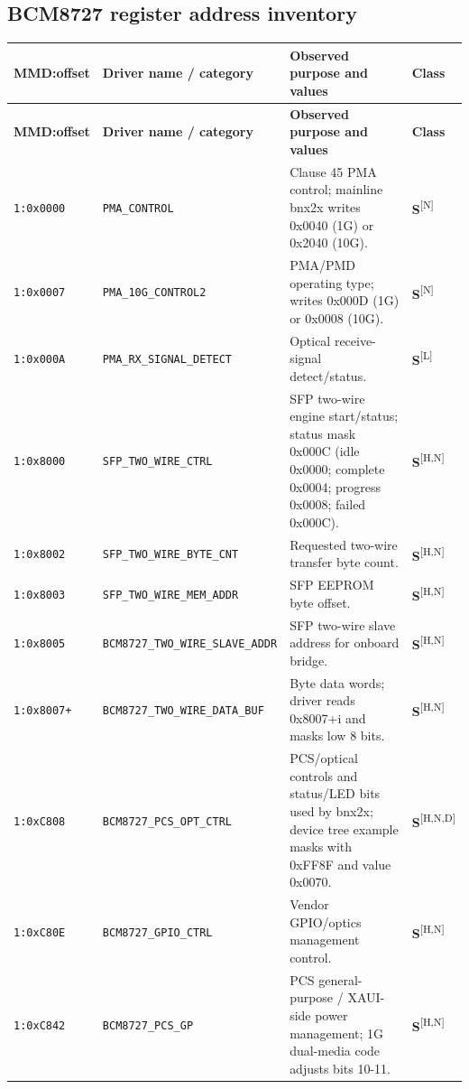 \documentclass[10pt,a4paper]{article}
\newcommand{\m}[1]{\textsf{\color{blue}\bfseries #1}}
\newcommand{\src}[1]{\textsuperscript{[#1]}}
\begin{document}
\subsection{BCM8727 register address inventory}
\scriptsize
\setlength\LTleft{0pt}
\setlength\LTright{0pt}
\begin{longtable}{@{}p{19mm}p{42mm}p{85mm}p{10mm}@{}}
\toprule
\textbf{MMD:offset} & \textbf{Driver name / category} & \textbf{Observed purpose and values} & \textbf{Class}\\\midrule
\endfirsthead
\toprule
\textbf{MMD:offset} & \textbf{Driver name / category} & \textbf{Observed purpose and values} & \textbf{Class}\\\midrule
\endhead
\texttt{1:0x0000} & \texttt{PMA\_CONTROL} & Clause 45 PMA control; mainline bnx2x writes 0x0040 (1G) or 0x2040 (10G). & \m{S}\src{N} \\
\texttt{1:0x0007} & \texttt{PMA\_10G\_CONTROL2} & PMA/PMD operating type; writes 0x000D (1G) or 0x0008 (10G). & \m{S}\src{N} \\
\texttt{1:0x000A} & \texttt{PMA\_RX\_SIGNAL\_DETECT} & Optical receive-signal detect/status. & \m{S}\src{L} \\
\texttt{1:0x8000} & \texttt{SFP\_TWO\_WIRE\_CTRL} & SFP two-wire engine start/status; status mask 0x000C (idle 0x0000; complete 0x0004; progress 0x0008; failed 0x000C). & \m{S}\src{H,N} \\
\texttt{1:0x8002} & \texttt{SFP\_TWO\_WIRE\_BYTE\_CNT} & Requested two-wire transfer byte count. & \m{S}\src{H,N} \\
\texttt{1:0x8003} & \texttt{SFP\_TWO\_WIRE\_MEM\_ADDR} & SFP EEPROM byte offset. & \m{S}\src{H,N} \\
\texttt{1:0x8005} & \texttt{BCM8727\_TWO\_WIRE\_SLAVE\_ADDR} & SFP two-wire slave address for onboard bridge. & \m{S}\src{H,N} \\
\texttt{1:0x8007+} & \texttt{BCM8727\_TWO\_WIRE\_DATA\_BUF} & Byte data words; driver reads 0x8007+i and masks low 8 bits. & \m{S}\src{H,N} \\
\texttt{1:0xC808} & \texttt{BCM8727\_PCS\_OPT\_CTRL} & PCS/optical controls and status/LED bits used by bnx2x; device tree example masks with 0xFF8F and value 0x0070. & \m{S}\src{H,N,D} \\
\texttt{1:0xC80E} & \texttt{BCM8727\_GPIO\_CTRL} & Vendor GPIO/optics management control. & \m{S}\src{H,N} \\
\texttt{1:0xC842} & \texttt{BCM8727\_PCS\_GP} & PCS general-purpose / XAUI-side power management; 1G dual-media code adjusts bits 10-11. & \m{S}\src{H,N} \\

\end{longtable}
\end{document}
